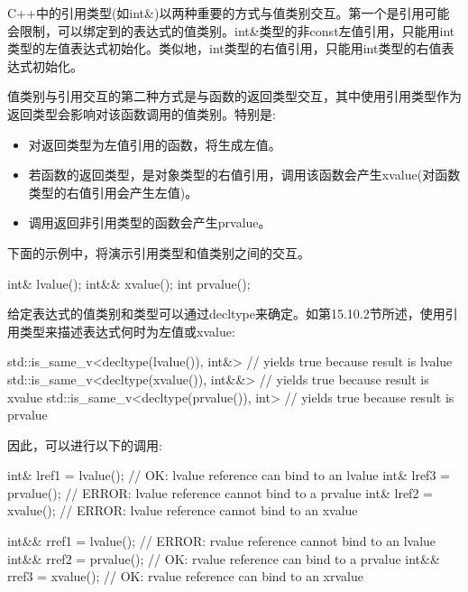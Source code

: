 C++中的引用类型(如int\&)以两种重要的方式与值类别交互。第一个是引用可能会限制，可以绑定到的表达式的值类别。int\&类型的非const左值引用，只能用int类型的左值表达式初始化。类似地，int类型的右值引用，只能用int类型的右值表达式初始化。

值类别与引用交互的第二种方式是与函数的返回类型交互，其中使用引用类型作为返回类型会影响对该函数调用的值类别。特别是:

\begin{itemize}
\item 
对返回类型为左值引用的函数，将生成左值。

\item 
若函数的返回类型，是对象类型的右值引用，调用该函数会产生xvalue(对函数类型的右值引用会产生左值)。

\item 
调用返回非引用类型的函数会产生prvalue。
\end{itemize}

下面的示例中，将演示引用类型和值类别之间的交互。

\begin{cpp}
int& lvalue();
int&& xvalue();
int prvalue();
\end{cpp}

给定表达式的值类别和类型可以通过decltype来确定。如第15.10.2节所述，使用引用类型来描述表达式何时为左值或xvalue:

\begin{cpp}
std::is_same_v<decltype(lvalue()), int&> // yields true because result is lvalue
std::is_same_v<decltype(xvalue()), int&&> // yields true because result is xvalue
std::is_same_v<decltype(prvalue()), int> // yields true because result is prvalue
\end{cpp}

因此，可以进行以下的调用:

\begin{cpp}
int& lref1 = lvalue(); // OK: lvalue reference can bind to an lvalue
int& lref3 = prvalue(); // ERROR: lvalue reference cannot bind to a prvalue
int& lref2 = xvalue(); // ERROR: lvalue reference cannot bind to an xvalue

int&& rref1 = lvalue(); // ERROR: rvalue reference cannot bind to an lvalue
int&& rref2 = prvalue(); // OK: rvalue reference can bind to a prvalue
int&& rref3 = xvalue(); // OK: rvalue reference can bind to an xrvalue
\end{cpp}
















